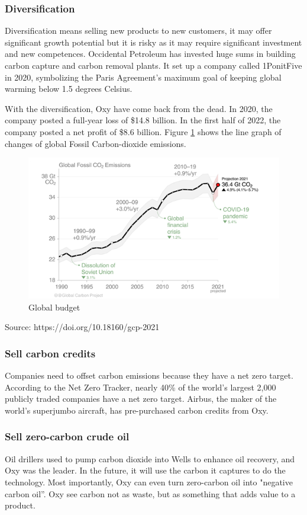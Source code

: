 \documentclass[
	a4paper, %
	12pt,%
]{CSSullivanBusinessReport}
\begin{document}
\begin{fullwidth}
\subsubsection{Diversification}
Diversification means selling new products to new customers, it may offer significant growth potential but it is risky as it may require significant investment and new competences. Occidental Petroleum has invested huge sums in building carbon capture and carbon removal plants. It set up a company called 1PonitFive in 2020, symbolizing the Paris Agreement's maximum goal of keeping global warming below 1.5 degrees Celsius.
\par
With the diversification, Oxy have come back from the dead. In 2020, the company posted a full-year loss of \$14.8 billion. In the first half of 2022, the company posted a net profit of \$8.6 billion.
Figure \ref{Global budget} shows the line graph of changes of global Fossil Carbon-dioxide emissions.
\begin{figure}[H]
    \centering
    \includegraphics{Images/Global Budget.png}
    \caption{Global budget}
    \label{Global budget}
\end{figure}
Source: https://doi.org/10.18160/gcp-2021
\subsubsection{Sell carbon credits}
Companies need to offset carbon emissions because they have a net zero target. According to the Net Zero Tracker, nearly 40\% of the world's largest 2,000 publicly traded companies have a net zero target. Airbus, the maker of the world's superjumbo aircraft, has pre-purchased carbon credits from Oxy.
\subsubsection{Sell zero-carbon crude oil}
Oil drillers used to pump carbon dioxide into Wells to enhance oil recovery, and Oxy was the leader. In the future, it will use the carbon it captures to do the technology. Most importantly, Oxy can even turn zero-carbon oil into "negative carbon oil”. Oxy see carbon not as waste, but as something that adds value to a product.


\end{fullwidth}
\end{document}
